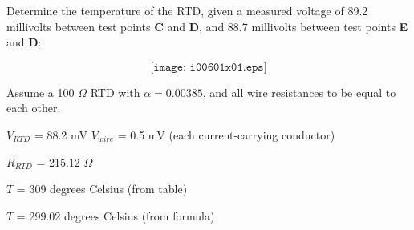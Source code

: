 

Determine the temperature of the RTD, given a measured voltage of 89.2 millivolts between test points {\bf C} and {\bf D}, and 88.7 millivolts between test points {\bf E} and {\bf D}:

$$\texttt{[image: i00601x01.eps]}$$

Assume a 100 $\Omega$ RTD with $\alpha = 0.00385$, and all wire resistances to be equal to each other.







$V_{RTD}$ = 88.2 mV \hskip 30pt $V_{wire}$ = 0.5 mV (each current-carrying conductor)

\vskip 10pt

$R_{RTD}$ = 215.12 $\Omega$

\vskip 10pt

$T$ = 309 degrees Celsius (from table)

\vskip 10pt

$T$ = 299.02 degrees Celsius (from formula)










